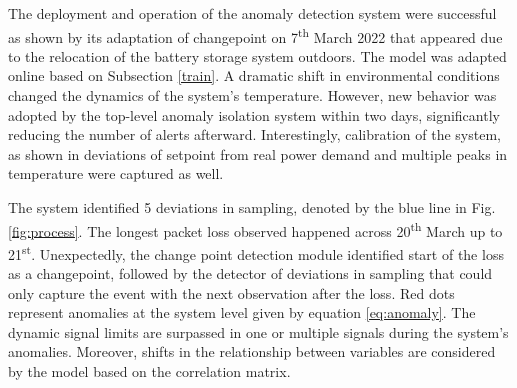 The deployment and operation of the anomaly detection system were successful as shown by its adaptation of changepoint on 7\textsuperscript{th} March 2022 that appeared due to the relocation of the battery storage system outdoors. The model was adapted online based on Subsection \ref{train}. A dramatic shift in environmental conditions changed the dynamics of the system's temperature. However, new behavior was adopted by the top-level anomaly isolation system within two days, significantly reducing the number of alerts afterward. Interestingly, calibration of the system, as shown in deviations of setpoint from real power demand and multiple peaks in temperature were captured as well. 

The system identified 5 deviations in sampling, denoted by the blue line in Fig. \ref{fig:process}. The longest packet loss observed happened across 20\textsuperscript{th} March up to 21\textsuperscript{st}. Unexpectedly, the change point detection module identified start of the loss as a changepoint, followed by the detector of deviations in sampling that could only capture the event with the next observation after the loss. Red dots represent anomalies at the system level given by equation \eqref{eq:anomaly}. The dynamic signal limits are surpassed in one or multiple signals during the system's anomalies. Moreover, shifts in the relationship between variables are considered by the model based on the correlation matrix.
